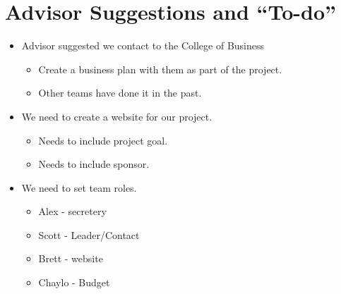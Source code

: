 \documentclass{article}
\begin{document}
\section{Advisor Suggestions and ``To-do''}
\begin{itemize}
\item Advisor suggested we contact to the College of Business
	\begin{itemize}
	\item Create a business plan with them as part of the project.
	\item Other teams have done it in the past.
	\end{itemize}
\item We need to create a website for our project.
	\begin{itemize}
	\item Needs to include project goal.
	\item Needs to include sponsor.
	\end{itemize}
\item We need to set team roles.
	\begin{itemize}
	\item Alex - secretery
	\item Scott - Leader/Contact
	\item Brett - website
	\item Chaylo - Budget
	\end{itemize}
\end{itemize}
\end{document}
